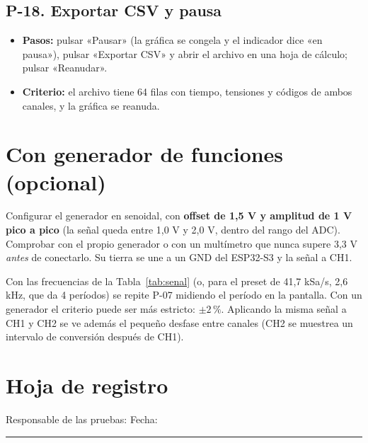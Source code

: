 \documentclass[12pt,a4paper]{article}
\begin{document}
\subsection*{P-18. Exportar CSV y pausa}
\begin{itemize}
  \item \textbf{Pasos:} pulsar «Pausar» (la gráfica se congela y el indicador dice «en pausa»), pulsar «Exportar CSV» y abrir el archivo en una hoja de cálculo; pulsar «Reanudar».
  \item \textbf{Criterio:} el archivo tiene 64 filas con tiempo, tensiones y códigos de ambos canales, y la gráfica se reanuda.
\end{itemize}

\section{Con generador de funciones (opcional)}
\label{sec:generador}

Configurar el generador en senoidal, con \textbf{offset de 1{,}5 V y amplitud de 1 V pico a pico} (la señal queda entre 1{,}0 V y 2{,}0 V, dentro del rango del ADC). Comprobar con el propio generador o con un multímetro que nunca supere 3{,}3 V \emph{antes} de conectarlo. Su tierra se une a un GND del ESP32-S3 y la señal a CH1.

Con las frecuencias de la Tabla~\ref{tab:senal} (o, para el preset de 41{,}7 kSa/s, 2{,}6 kHz, que da 4 períodos) se repite P-07 midiendo el período en la pantalla. Con un generador el criterio puede ser más estricto: $\pm 2\,\%$. Aplicando la misma señal a CH1 y CH2 se ve además el pequeño desfase entre canales (CH2 se muestrea un intervalo de conversión después de CH1).

\section{Hoja de registro}
\label{sec:hoja}

\noindent Responsable de las pruebas: \hrulefill \quad Fecha: \rule{3cm}{0.4pt}
\end{document}
